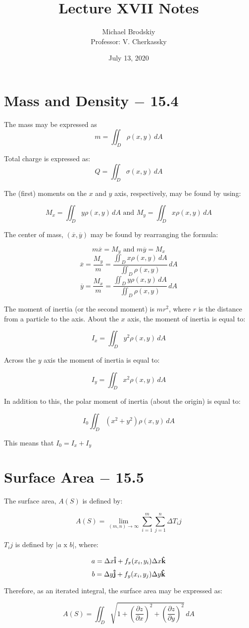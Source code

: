 \documentclass[12pt]{article}
\title{Lecture XVII Notes}
\date{July 13, 2020}
\author{Michael Brodskiy\\ \small Professor: V. Cherkassky}
\begin{document}
\maketitle

\section{Mass and Density $-$ 15.4}

The mass may be expressed as 
$$m=\iint_D \rho(x,y)\,dA$$

Total charge is expressed as:
$$Q=\iint_D \sigma(x,y)\,dA$$

The (first) moments on the $x$ and $y$ axis, respectively, may be found by using:

$$M_x=\iint_D y\rho(x,y)\,dA\text{ and }M_y=\iint_D x\rho(x,y)\,dA$$

The center of mass, $(\overline{x},\overline{y})$ may be found by rearranging the formula:

$$m\overline{x}=M_y\text{ and } m\overline{y}=M_x$$
$$\overline{x}=\frac{M_y}{m}=\frac{\iint_D x\rho(x,y)\,dA}{\iint_D \rho(x,y)}\,dA$$
  $$\overline{y}=\frac{M_x}{m}=\frac{\iint_D y\rho(x,y)\,dA}{\iint_D \rho(x,y)}\,dA$$

  The moment of inertia (or the second moment) is $mr^2$, where $r$ is the distance from a particle to the axis. About the $x$ axis, the moment of inertia is equal to:

  $$I_x = \iint_D y^2\rho(x,y)\,dA$$

  Across the $y$ axis the moment of inertia is equal to:

  $$I_y=\iint_D x^2\rho(x,y)\,dA$$

  In addition to this, the polar moment of inertia (about the origin) is equal to:

  $$I_0\iint_D (x^2+y^2)\rho(x,y)\,dA$$

  This means that $I_0=I_x+I_y$

  \section{Surface Area $-$ 15.5}

  The surface area, $A(S)$ is defined by:

  $$A(S)=\lim_{(m,n)\to\infty}\sum_{i=1}^m\sum_{j=1}^n \Delta T_ij$$

  $T_ij$ is defined by $|a\text{ x }b|$, where:

  $$a=\Delta x\bold{\hat{i}} + f_x(x_i,y_i)\Delta x \bold{\hat{k}}$$
  $$b=\Delta y\bold{\hat{j}} + f_y(x_i,y_j)\Delta y \bold{\hat{k}}$$

  Therefore, as an iterated integral, the surface area may be expressed as:

  $$A(S)=\iint_D \sqrt{1+\left(\frac{\partial z}{\partial x}\right)^2+\left(\frac{\partial z}{\partial y}\right)^2}\,dA$$
\end{document}
